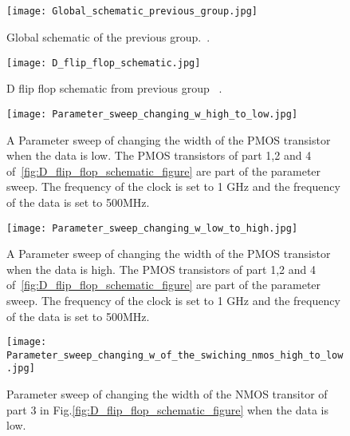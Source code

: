 \begin{appendices}
\section{}\label{sec:appendix}

\begin{figure}[h]
\texttt{[image: Global\_schematic\_previous\_group.jpg]}
\caption{Global schematic of the previous group.~\cite{powerdac}.}
\label{fig:Global_schematic_previous_group_figure}
\end{figure}

\begin{figure}[h]
 \texttt{[image: D\_flip\_flop\_schematic.jpg]}
 \caption{ D flip flop schematic from previous group ~\cite{powerdac}.}
 \label{fig:D_flip_flop_ previous_group_figure}
\end{figure}

\begin{figure}[h]
 \texttt{[image: Parameter\_sweep\_changing\_w\_high\_to\_low.jpg]}
 \caption{A Parameter sweep of changing the width of the PMOS transistor when the data is low. The PMOS transistors of part 1,2 and 4 of~\ref{fig:D_flip_flop_schematic_figure} are part of the parameter sweep. The frequency of the clock is set to 1 GHz and the frequency of the data is set to 500MHz.} 
 \label{fig:parametersweep_changing_w_high_to_low_figure}
\end{figure}

\begin{figure}[h]
 \texttt{[image: Parameter\_sweep\_changing\_w\_low\_to\_high.jpg]}
 \caption{A Parameter sweep of changing the width of the PMOS transistor when the data is high. The PMOS transistors of part 1,2 and 4 of~\ref{fig:D_flip_flop_schematic_figure} are part of the parameter sweep. The frequency of the clock is set to 1 GHz and the frequency of the data is set to 500MHz.}
 \label{fig:parametersweep_changing_w_low_to_high_figure}
\end{figure}

\begin{figure}[h]
 \texttt{[image: Parameter\_sweep\_changing\_w\_of\_the\_swiching\_nmos\_high\_to\_low.jpg]}
 \caption{Parameter sweep of changing the width of the NMOS transitor of part 3 in Fig.\ref{fig:D_flip_flop_schematic_figure} when the data is low.}
 \label{fig:Parameter_sweep_changing_w_of_the_swiching_nmos_high_to_low_figure}
\end{figure}


\end{appendices}
